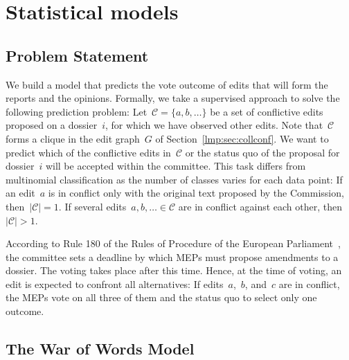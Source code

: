 \section{Statistical models}
\label{lmp:sec:models}


\subsection{Problem Statement}

We build a model that predicts the vote outcome of edits that will form the reports and the opinions.
Formally, we take a supervised approach to solve the following prediction problem:
Let~$\mathcal{C} = \{ a, b, \ldots \}$ be a set of conflictive edits proposed on a dossier~$i$, for which we have observed other edits.
Note that~$\mathcal{C}$ forms a clique in the edit graph~$G$ of Section~\ref{lmp:sec:collconf}.
We want to predict which of the conflictive edits in~$\mathcal{C}$ or the status quo of the proposal for dossier~$i$ will be accepted within the committee.
This task differs from multinomial classification as the number of classes varies for each data point:
If an edit~$a$ is in conflict only with the original text proposed by the Commission, then~$\vert \mathcal{C} \vert = 1$.
If several edits~$a, b, \ldots \in \mathcal{C}$ are in conflict against each other, then~$\vert \mathcal{C} \vert > 1$.

According to Rule 180 of the Rules of Procedure of the European Parliament~\cite{europarl2021rule180}, the committee sets a deadline by which MEPs must propose amendments to a dossier.
The voting takes place after this time.
Hence, at the time of voting, an edit is expected to confront all alternatives:
If edits~$a$,~$b$, and~$c$ are in conflict, the MEPs vote on all three of them and the status quo to select only one outcome.

\subsection{The War of Words Model}

